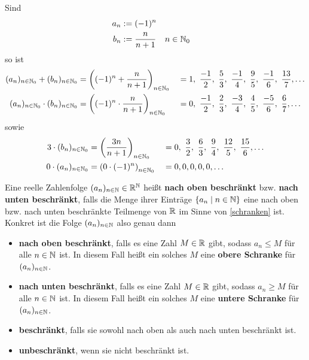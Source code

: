 \begin{bsp}
Sind
\begin{align*}
 a_n & := (-1)^n \\
 b_n & := \frac{n}{n+1} && n \in {\mathbb N}_0
\end{align*}
so ist
\begin{align*}
 (a_n)_{n\in \Nz_0} + (b_n)_{n\in \Nz_0} & = \left((-1)^n+ \frac{n}{n+1}\right)_{n\in \Nz_0} &&= 1,\ \frac{-1}{2},\ \frac{5}{3},\ \frac{-1}{4},\ \frac{9}{5},\ \frac{-1}{6},\ \frac{13}{7},\dots \\
  (a_n)_{n\in \Nz_0} \cdot  (b_n)_{n\in \Nz_0} & = \left((-1)^n\cdot \frac{n}{n+1}\right)_{n\in \Nz_0} &&= 0,\ \frac{-1}{2},\ \frac{2}{3},\ \frac{-3}{4},\ \frac{4}{5},\ \frac{-5}{6},\ \frac{6}{7},\dots
\end{align*}
sowie
\begin{align*}
 3\cdot (b_n)_{n\in \Nz_0} & = \left( \frac{3n}{n+1}\right)_{n\in \Nz_0} && =0,\ \frac{3}{2},\ \frac{6}{3},\ \frac{9}{4},\ \frac{12}{5},\ \frac{15}{6},\dots \\
 0\cdot (a_n)_{n\in \Nz_0} & = \left(0\cdot (-1)^n\right)_{n\in \Nz_0} && = 0,0,0,0,0,\dots
\end{align*}

\end{bsp}



\begin{de}[Beschränktheit]
 Eine reelle Zahlenfolge $(a_n)_{n\in {\mathbb N}}\in {\mathbb R}^{\mathbb N}$ heißt \textbf{nach oben beschränkt} bzw. \textbf{nach unten beschränkt}, falls die Menge ihrer Einträge $\{a_n\mid n\in {\mathbb N}\}$ eine nach oben bzw. nach unten beschränkte Teilmenge von ${\mathbb R}$ im Sinne von \cref{schranken} ist. Konkret ist die Folge $(a_n)_{n\in {\mathbb N}}$ also genau dann
 \begin{itemize}
  \item \textbf{nach oben beschränkt}, falls es eine Zahl $M\in {\mathbb R}$ gibt, sodass $a_n\leq M$ für alle $n\in {\mathbb N}$ ist. In diesem Fall heißt ein solches $M$ eine \textbf{obere Schranke} für $(a_n)_{n\in {\mathbb N}}$.
  \item \textbf{nach unten beschränkt}, falls es eine Zahl $M\in {\mathbb R}$ gibt, sodass $a_n\geq M$ für alle $n\in {\mathbb N}$ ist. In diesem Fall heißt ein solches $M$ eine \textbf{untere Schranke} für $(a_n)_{n\in {\mathbb N}}$.
  \item \textbf{beschränkt}, falls sie sowohl nach oben als auch nach unten beschränkt ist.
  \item \textbf{unbeschränkt}, wenn sie nicht beschränkt ist.
 \end{itemize}
\end{de}


